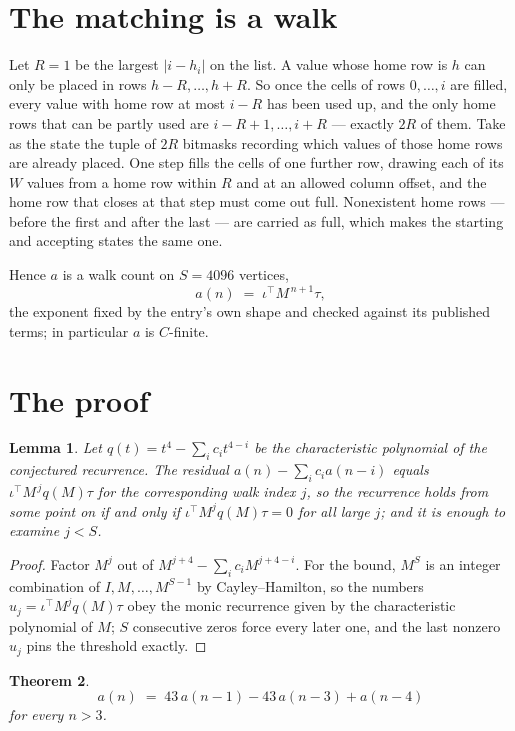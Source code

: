 \documentclass[11pt,a4paper]{article}
\theoremstyle{plain}
\newtheorem{theorem}{Theorem}
\newtheorem{lemma}[theorem]{Lemma}
\theoremstyle{definition}
\begin{document}
\section{The matching is a walk}

Let $R=1$ be the largest $|i-h_i|$ on the list. A value whose home row is $h$ can only be
placed in rows $h-R,\dots,h+R$. So once the cells of rows $0,\dots,i$ are filled, every
value with home row at most $i-R$ has been used up, and the only home rows that can be
partly used are $i-R+1,\dots,i+R$ --- exactly $2R$ of them. Take as the state the tuple of
$2R$ bitmasks recording which values of those home rows are already placed. One step fills
the cells of one further row, drawing each of its $W$ values from a home row within $R$
and at an allowed column offset, and the home row that closes at that step must come out
full. Nonexistent home rows --- before the first and after the last --- are carried as
full, which makes the starting and accepting states the same one.

Hence $a$ is a walk count on $S=4096$ vertices,
\[
a(n)\;=\;\iota^{\!\top}M^{\,n+1}\tau ,
\]
the exponent fixed by the entry's own shape and checked against its published terms; in
particular $a$ is $C$-finite.

\section{The proof}

\begin{lemma}\label{lem:crit}
Let $q(t)=t^{4}-\sum_i c_it^{4-i}$ be the characteristic polynomial of the
conjectured recurrence. The residual $a(n)-\sum_ic_ia(n-i)$ equals
$\iota^{\!\top}M^{\,j}q(M)\tau$ for the corresponding walk index $j$, so the recurrence
holds from some point on if and only if $\iota^{\!\top}M^{j}q(M)\tau=0$ for all large $j$;
and it is enough to examine $j<S$.
\end{lemma}

\begin{proof}
Factor $M^{j}$ out of $M^{j+4}-\sum_ic_iM^{j+4-i}$. For the bound, $M^{S}$
is an integer combination of $I,M,\dots,M^{S-1}$ by Cayley--Hamilton, so the numbers
$u_j=\iota^{\!\top}M^{j}q(M)\tau$ obey the monic recurrence given by the characteristic
polynomial of $M$; $S$ consecutive zeros force every later one, and the last nonzero $u_j$
pins the threshold exactly.
\end{proof}

\begin{theorem}
\[
a(n)\;=\;43\,a(n-1) - 43\,a(n-3) + a(n-4)
\]
for every $n>3$.
\end{theorem}
\end{document}

